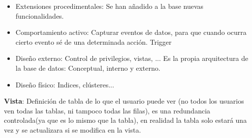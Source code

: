\documentclass[12pt, twoside, openright]{report} %
\begin{document}
  \begin{itemize}
  \item Extensiones procedimentales: Se han añadido a la base nuevas
    funcionalidades.
    
  \item Comportamiento activo: Capturar eventos de datos, para que cuando
    ocurra cierto evento sé de una determinada acción. Trigger
    
  \item Diseño externo: Control de privilegios, vistas, ... Es la propia
    arquitectura de la base de datos: Conceptual, interno y externo.
    
  \item Diseño físico: Indices, clústeres...
    
  \end{itemize}

  
  \textbf{Vista}: Definición de tabla de lo que el usuario puede ver (no
  todos los usuarios ven todas las tablas, ni tampoco todas las filas),
  es una redundancia controlada(ya que es lo mismo que la tabla), en
  realidad la tabla solo estará una vez y se actualizara si se modifica
  en la vista.
  
\end{document}
